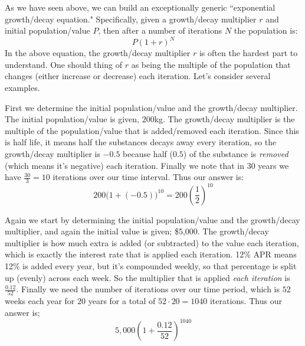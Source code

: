 \documentclass{ximera}
\begin{document}
        As we have seen above, we can build an exceptionally generic ``exponential growth/decay equation." Specifically, given a growth/decay multiplier $r$ and initial population/value $P$, then after a number of iterations $N$ the population is:
        \[
            P(1 + r)^N
        \]
        In the above equation, the growth/decay multiplier $r$ is often the hardest part to understand. One should thing of $r$ as being the multiple of the population that changes (either increase or decrease) each iteration. Let's consider several examples.
        
        \begin{explanation}%
            First we determine the initial population/value and the growth/decay multiplier. The initial population/value is given, $200$kg. The growth/decay multiplier is the multiple of the population/value that is added/removed each iteration. Since this is half life, it means half the substances decays away every iteration, so the growth/decay multiplier is $-0.5$ because half ($0.5$) of the substance is \textit{removed} (which means it's negative) each iteration. Finally we note that in $30$ years we have $\frac{30}{3} = 10$ iterations over our time interval. Thus our answer is:
            \[
                200\big(1 + (-0.5)\big)^{10} = 200\left(\frac{1}{2}\right)^{10}
            \]
        \end{explanation}%
            
        \begin{explanation}%
            Again we start by determining the initial population/value and the growth/decay multiplier, and again the initial value is given; \$5,000. The growth/decay multiplier is how much extra is added (or subtracted) to the value each iteration, which is exactly the interest rate that is applied each iteration. 12\% APR means 12\% is added every year, but it's compounded weekly, so that percentage is split up (evenly) across each week. So the multiplier that is applied \textit{each iteration} is $\frac{0.12}{52}$. Finally we need the number of iterations over our time period, which is $52$ weeks each year for $20$ years for a total of $52 \cdot 20 = 1040$ iterations. Thus our answer is;
            \[
                5,000\left(1 + \frac{0.12}{52}\right)^{1040}
            \]
            
        \end{explanation}%
        
\end{document}
